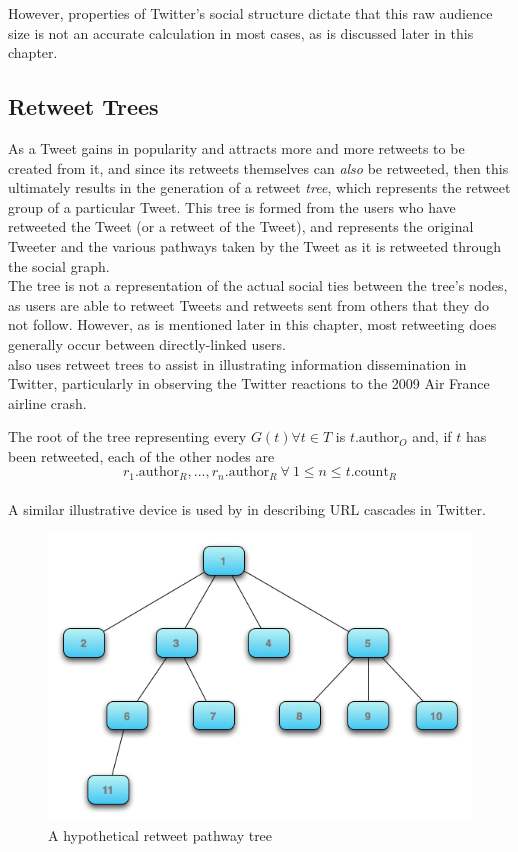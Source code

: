 However, properties of Twitter's social structure dictate that this raw audience size is not an accurate calculation in most cases, as is discussed later in this chapter.


\subsection{Retweet Trees}
As a Tweet gains in popularity and attracts more and more retweets to be created from it, and since its retweets themselves can \textit{also} be retweeted, then this ultimately results in the generation of a retweet \textit{tree}, which represents the retweet group of a particular Tweet. This tree is formed from the users who have retweeted the Tweet (or a retweet of the Tweet), and represents the original Tweeter and the various pathways taken by the Tweet as it is retweeted through the social graph.\\
The tree is not a representation of the actual social ties between the tree's nodes, as users are able to retweet Tweets and retweets sent from others that they do not follow. However, as is mentioned later in this chapter, most retweeting does generally occur between directly-linked users.\\
\cite{kwak10} also uses retweet trees to assist in illustrating information dissemination in Twitter, particularly in observing the Twitter reactions to the 2009 Air France airline crash.

The root of the tree representing every $G(t) \forall t \in T$ is $t.\textrm{author}_O$ and, if $t$ has been retweeted, each of the other nodes are $$r_1.\textrm{author}_R, ... , r_n.\textrm{author}_R \: \forall \: 1 \leq n \leq t.\mathrm{count}_R $$\\
A similar illustrative device is used by \cite{galuba10} in describing URL cascades in Twitter.

\begin{figure}[h]
\centering
\includegraphics[scale=0.5]{3.Chapter1/Media/tree.png} 
\caption{A hypothetical retweet pathway tree}
\label{fig:retweet_tree}
\end{figure}

